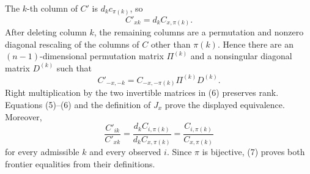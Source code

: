 The \(k\)-th column of \(C'\) is \(d_kc_{\pi(k)}\), so
\[
 C'_{xk}=d_kC_{x,\pi(k)}. \tag{5}
\]
After deleting column \(k\), the remaining columns are a permutation and nonzero diagonal rescaling of the columns of \(C\) other than \(\pi(k)\). Hence there are an \((n-1)\)-dimensional permutation matrix \(\Pi^{(k)}\) and a nonsingular diagonal matrix \(D^{(k)}\) such that
\[
 C'_{-x,-k}=C_{-x,-\pi(k)}\Pi^{(k)}D^{(k)}. \tag{6}
\]
Right multiplication by the two invertible matrices in (6) preserves rank. Equations (5)--(6) and the definition of \(J_x\) prove the displayed equivalence. Moreover,
\[
 \frac{C'_{ik}}{C'_{xk}}
 =\frac{d_kC_{i,\pi(k)}}{d_kC_{x,\pi(k)}}
 =\frac{C_{i,\pi(k)}}{C_{x,\pi(k)}} \tag{7}
\]
for every admissible \(k\) and every observed \(i\). Since \(\pi\) is bijective, (7) proves both frontier equalities from their definitions.